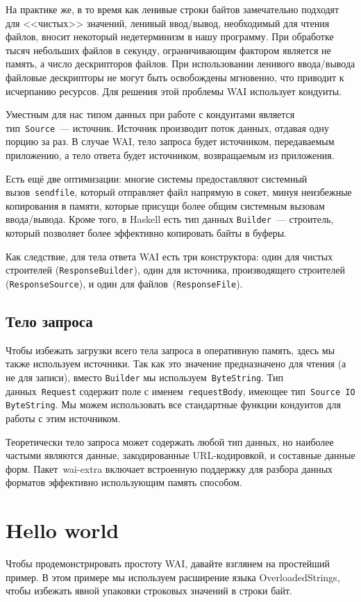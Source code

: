 На практике же, в то время как ленивые строки байтов замечательно подходят для
<<чистых>> значений, ленивый ввод/вывод, необходимый для чтения файлов, вносит
некоторый недетерминизм в нашу программу. При обработке тысяч небольших файлов
в секунду, ограничивающим фактором является не память, а число дескрипторов
файлов. При использовании ленивого ввода/вывода файловые дескрипторы не могут
быть освобождены мгновенно, что приводит к исчерпанию ресурсов. Для решения
этой проблемы WAI использует кондуиты.

Уместным для нас типом данных при работе с кондуитами является
тип~\lstinline!Source!~--- источник. Источник производит поток данных, отдавая
одну порцию за раз. В случае WAI, тело запроса будет источником, передаваемым
приложению, а тело ответа будет источником, возвращаемым из приложения.

Есть ещё две оптимизации: многие системы предоставляют системный
вызов~\texttt{sendfile}, который отправляет файл напрямую в сокет, минуя
неизбежные копирования в памяти, которые присущи более общим системным вызовам
ввода/вывода. Кроме того, в Haskell есть тип данных \lstinline!Builder!~---
строитель, который позволяет более эффективно копировать байты в буферы.

Как следствие, для тела ответа WAI есть три конструктора: один для чистых
строителей (\lstinline!ResponseBuilder!), один для источника, производящего
строителей (\lstinline!ResponseSource!), и один для
файлов~(\lstinline!ResponseFile!).

\subsection {Тело запроса}
Чтобы избежать загрузки всего тела запроса в оперативную память, здесь мы также
используем источники. Так как это значение предназначено для чтения (а не для
записи), вместо \lstinline!Builder! мы используем~\lstinline!ByteString!. Тип
данных~\lstinline!Request! содержит поле с именем~\lstinline!requestBody!,
имеющее тип~\lstinline!Source IO ByteString!.  Мы можем использовать
все стандартные функции кондуитов для работы с этим источником.

Теоретически тело запроса может содержать любой тип данных, но наиболее частыми
являются данные, закодированные URL-кодировкой, и составные данные форм.
Пакет~wai-extra включает встроенную поддержку для разбора данных форматов
эффективно использующим память способом.

\section{Hello world}
Чтобы продемонстрировать простоту WAI, давайте взглянем на простейший пример.
В этом примере мы используем расширение языка OverloadedStrings, чтобы избежать
явной упаковки строковых значений в строки байт.


